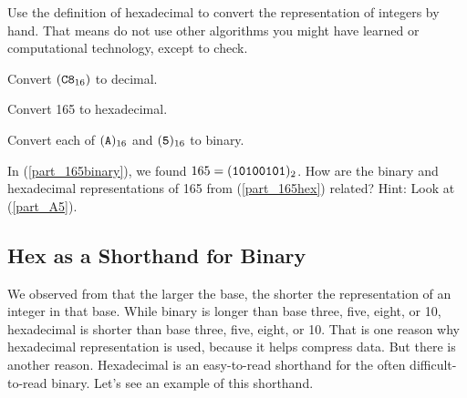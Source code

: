 \begin{act}
\label{act_hex_decimal}
    Use the definition of hexadecimal to convert the representation of integers by hand. That means do not use other algorithms you might have learned or computational technology, except to check.
        \begin{actpart}
            \item Convert $(\texttt{C8}_{16})$ to decimal.
            \item \label{part_165hex} Convert 165 to hexadecimal.
            \item \label{part_A5} Convert each of $(\texttt{A})_{16}$ and $(\texttt{5})_{16}$ to binary.
            \item In  (\ref{part_165binary}), we found $165 = {(\texttt{10100101})_2}$. How are the binary and hexadecimal representations of 165 from (\ref{part_165hex}) related? Hint: Look at (\ref{part_A5}).
        \end{actpart}
\end{act}


\newcommand{\subhexforbinary}{Hex as a Shorthand for Binary}
\subsection{\subhexforbinary}
\label{sub_hex_shorthand_binary}

We observed from  that the larger the base, the shorter the representation of an integer in that base. While binary is longer than base three, five, eight, or 10, hexadecimal is shorter than base three, five, eight, or 10.
That is one reason why hexadecimal representation is used, because it helps compress data.  But there is another reason. Hexadecimal is an easy-to-read shorthand for the often difficult-to-read binary.  Let's see an example of this shorthand. 

